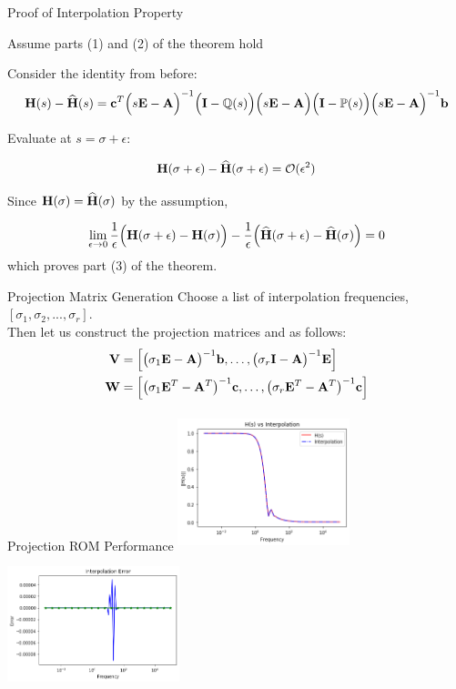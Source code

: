 \begin{frame}{Proof of Interpolation Property}

Assume parts (1) and (2) of the theorem hold\\

\bigskip

Consider the identity from before:
$$
    {\bf H}(s) -{\bf \widehat{H}}(s) = 
    {\bf c}^T \Big( s{\bf E-A} \Big)^{-1} \Big( {\bf I} - \mathbb{Q}(s) \Big) \Big( s{\bf E-A} \Big) \Big( {\bf I} - \mathbb{P}(s) \Big) \Big( s{\bf E-A} \Big)^{-1} {\bf b}
$$

Evaluate at $s = \sigma + \epsilon$:

$${\bf H}(\sigma + \epsilon) -{\bf \widehat{H}}(\sigma + \epsilon) = \mathcal{O}(\epsilon^2)$$

Since ${\bf H}(\sigma) = {\bf \widehat H}(\sigma)$ by the assumption,

$$\lim_{\epsilon \to 0} \frac{1}{\epsilon}\Big({\bf H}(\sigma + \epsilon) - {\bf H}(\sigma)\Big) - \frac{1}{\epsilon}\Big({\bf \widehat H}(\sigma + \epsilon) - {\bf \widehat H}(\sigma)\Big) = 0$$
which proves part (3) of the theorem.
\end{frame}
\begin{frame}{Projection Matrix Generation}
Choose a list of interpolation frequencies, \([\sigma_1,\sigma_2, ... , \sigma_r]\).\\
\bigskip
Then let us construct the projection matrices and as follows:
\begin{align*}
    {\bf V} & = \Big[ \big( \sigma_1{\bf E}-{\bf A} \big)^{-1}{\bf b}, \dots, \big( \sigma_r{\bf I}-{\bf A} \big)^{-1}{\bf E} \Big] \\
    {\bf W} & = \Big[ \big( \sigma_1{\bf E}^T-{\bf A}^T \big)^{-1} {\bf c}, \dots, \big( \sigma_r{\bf E}^T-{\bf A}^T \big)^{-1} {\bf c} \Big] \\ 
\end{align*}
\end{frame}
\begin{frame}{Projection ROM Performance}
\centering
\includegraphics[width=5cm, height= 4cm]{figures/1D_proj.png}
\bigskip
\includegraphics[width=5cm, height=4cm]{figures/1D_proj_err.png}
    
\end{frame}
